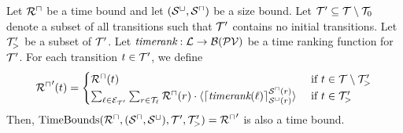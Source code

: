 \begin{theorem}
  Let ${\mathcal{R}^\sqcap}$ be a time bound and let ${({\mathcal{S}^\sqcup}, {\mathcal{S}^\sqcap})}$ be a size bound.
  Let $\mathcal{T}' \subseteq \mathcal{T} \setminus \mathcal{T}_0$ denote a subset of all transitions such that $\mathcal{T}'$ contains no initial transitions.
  Let $\mathcal{T}'_>$ be a subset of $\mathcal{T}'$.
  Let $\emph{timerank}: \mathcal{L} \rightarrow \mathcal{B}(\mathcal{PV})$ be a time ranking function for $\mathcal{T}'$.
  For each transition $t \in \mathcal{T}'$, we define
  \[ {\mathcal{R}^\sqcap}'(t) = 
  \begin{cases}
    {\mathcal{R}^\sqcap}(t) & \text{ if } t \in \mathcal{T} \setminus \mathcal{T}'_> \\
    \sum_{\ell \in \mathcal{E}_{\mathcal{T}'}} \sum_{r \in \mathcal{T}_\ell} {\mathcal{R}^\sqcap}(r) \cdot \langle\lceil \emph{timerank}(\ell) \rceil^{{\mathcal{S}^\sqcap}(r)}_{{\mathcal{S}^\sqcup}(r)}\rangle & \text{ if } t \in \mathcal{T}'_>
  \end{cases}
  \]
  Then, $\text{TimeBounds}({\mathcal{R}^\sqcap}, ({\mathcal{S}^\sqcap}, {\mathcal{S}^\sqcup}), \mathcal{T}', \mathcal{T}'_>) = {\mathcal{R}^\sqcap}'$ is also a time bound.
\end{theorem}

